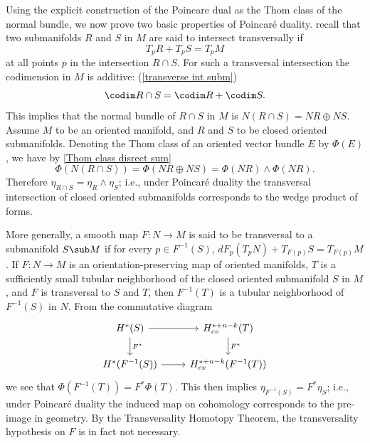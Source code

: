 Using the explicit construction of the Poincare dual as the Thom class of the normal bundle, we now prove two basic properties of Poincar\'e duality. recall that two 
submanifolds $R$ and $S$ in $M$ are said to intersect transversally if
\[T_pR+T_pS=T_pM\]
at all points $p$ in the intersection $R\cap S$. For such a transversal intersection the codimension in $M$ is additive: (\cref{transverse int subm})
\[\codim R\cap S=\codim R+\codim S.\]
This implies that the normal bundle of $R\cap S$ in $M$ is $N(R\cap S)=NR\oplus NS$. Assume $M$ to be an oriented manifold, and $R$ and $S$ to be closed oriented 
submanifolds. Denoting the Thom class of an oriented vector bundle $E$ by $\Phi(E)$, we have by \cref{Thom class disrect sum}
\[\Phi(N(R\cap S))=\Phi(NR\oplus NS)=\Phi(NR)\wedge\Phi(NR).\]
Therefore $\eta_{R\cap S}=\eta_R\wedge\eta_S$; i.e., under Poincar\'e duality the transversal intersection of closed oriented submanifolds corresponds to the wedge 
product of forms.\par
More generally, a smooth map $F:N\to M$ is said to be transversal to a submanifold $S\sub M$ if for every $p\in F^{-1}(S)$, $dF_p(T_pN)+T_{F(p)}S=T_{F(p)}M$. If 
$F:N\to M$ is an orientation-preserving map of oriented manifolds, $T$ is a sufficiently small tubular neighborhood of the closed oriented submanifold $S$ in $M$, and 
$F$ is transversal to $S$ and $T$, then $F^{-1}(T)$ is a tubular neighborhood of $F^{-1}(S)$ in $N$. From the commutative diagram
\[\begin{tikzcd}
H^*(S)\ar[r]\ar[d,"F^*"]&H^{*+n-k}_{cv}(T)\ar[d,"F^*"]\\
H^*(F^{-1}(S))\ar[r]&H^{*+n-k}_{cv}(F^{-1}(T))
\end{tikzcd}\]
we see that $\Phi(F^{-1}(T))=F^*\Phi(T)$. This then implies $\eta_{F^{-1}(S)}=F^*\eta_S$; i.e., under Poincar\'e duality the induced map on cohomology corresponds to 
the pre-image in geometry. By the Transversality Homotopy Theorem, the transversality hypothesis on $F$ is in fact not necessary.
